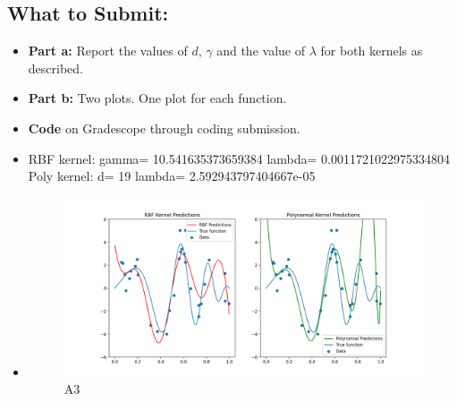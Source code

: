 \documentclass{article}
\begin{document}
\begin{aprob}
    \subsection*{What to Submit:}
    \begin{itemize}
        \item \textbf{Part a:} Report the values of $d$, $\gamma$ and the value of $\lambda$ for both kernels as described.
        \item \textbf{Part b:} Two plots. One plot for each function.
        \item \textbf{Code} on Gradescope through coding submission.
    \end{itemize}
    \begin{itemize}
        \item RBF kernel: gamma= 10.541635373659384  lambda= 0.0011721022975334804 \\
        Poly kernel: d= 19  lambda= 2.592943797404667e-05 \\
        \item \begin{figure}[h!]
            \centering
            \includegraphics[width=.9\linewidth]{kernel.png}
            \caption{A3}
            \label{fig:kernel}
        \end{figure}
    \end{itemize}
\end{aprob}
\end{document}
